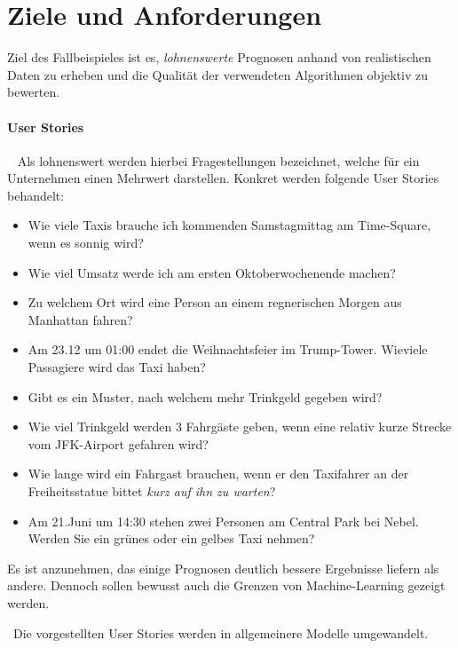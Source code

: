 \section{Ziele und Anforderungen}
\label{sec:Fallbeispiel} \label{sec:TaxiAllgemein} \label{sec:Allgemein}
Ziel des Fallbeispieles ist es, \textit{lohnenswerte} Prognosen anhand von realistischen Daten zu erheben und die Qualität der verwendeten Algorithmen objektiv zu bewerten. 

\paragraph{User Stories} ~\newline
Als lohnenswert werden hierbei Fragestellungen bezeichnet, welche für ein Unternehmen einen Mehrwert darstellen. Konkret werden folgende User Stories behandelt: ~\newline

\begin{itemize}
	\item Wie viele Taxis brauche ich kommenden Samstagmittag am Time-Square, wenn es sonnig wird?
	\item Wie viel Umsatz werde ich am ersten Oktoberwochenende machen?
	\item Zu welchem Ort wird eine Person an einem regnerischen Morgen aus Manhattan fahren?
	\item Am 23.12 um 01:00 endet die Weihnachtsfeier im Trump-Tower. Wieviele Passagiere wird das Taxi haben?
	\item Gibt es ein Muster, nach welchem mehr Trinkgeld gegeben wird?
	\item Wie viel Trinkgeld werden 3 Fahrgäste geben, wenn eine relativ kurze Strecke vom JFK-Airport gefahren wird?
	\item Wie lange wird ein Fahrgast brauchen, wenn er den Taxifahrer an der Freiheitsstatue bittet \textit{kurz auf ihn zu warten}?
	\item Am 21.Juni um 14:30 stehen zwei Personen am Central Park bei Nebel. Werden Sie ein grünes oder ein gelbes Taxi nehmen? 
\end{itemize}

Es ist anzunehmen, das einige Prognosen deutlich bessere Ergebnisse liefern als andere. Dennoch sollen bewusst auch die Grenzen von Machine-Learning gezeigt werden.

~\newline Die vorgestellten User Stories werden in allgemeinere Modelle umgewandelt.

